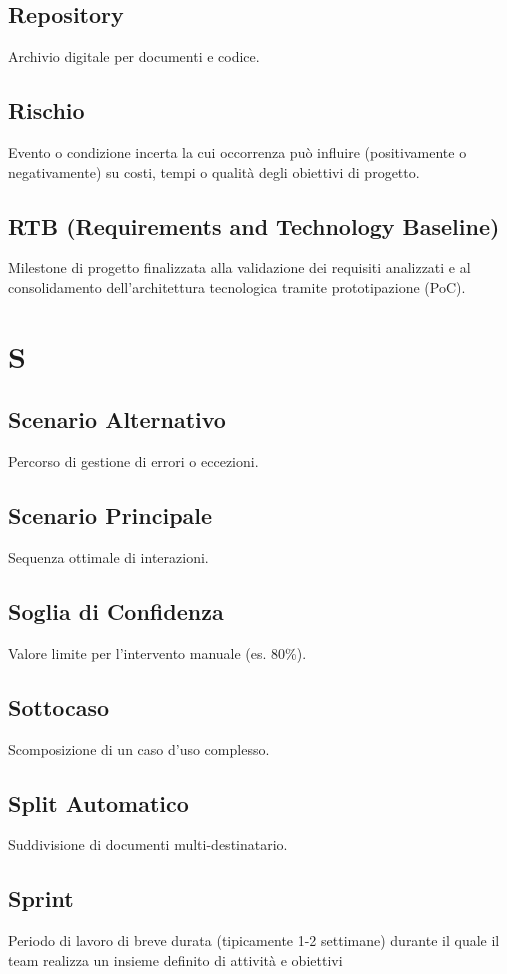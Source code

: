 \documentclass[a4paper,12pt]{article}
\begin{document}
\subsection{Repository}
Archivio digitale per documenti e codice.

\subsection{Rischio}
 Evento o condizione incerta la cui occorrenza può influire (positivamente o negativamente) su costi, tempi o qualità degli obiettivi di progetto.

\subsection{RTB (Requirements and Technology Baseline)}
Milestone di progetto finalizzata alla validazione dei requisiti analizzati e al consolidamento dell'architettura tecnologica tramite prototipazione (PoC).

\section{S}
\subsection{Scenario Alternativo}
Percorso di gestione di errori o eccezioni.

\subsection{Scenario Principale}
Sequenza ottimale di interazioni.

\subsection{Soglia di Confidenza}
Valore limite per l'intervento manuale (es. 80\%).

\subsection{Sottocaso}
Scomposizione di un caso d'uso complesso.

\subsection{Split Automatico}
Suddivisione di documenti multi-destinatario.

\subsection{Sprint}
Periodo di lavoro di breve durata (tipicamente 1-2 settimane) durante il quale il team realizza un insieme definito di attività e obiettivi
\end{document}
